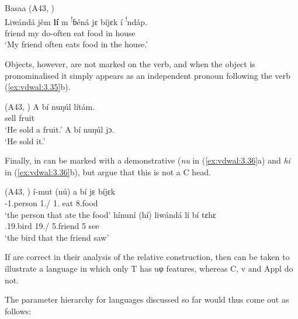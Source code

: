 \documentclass[output=paper]{langsci/langscibook}
\begin{document}
\ea\label{ex:vdwal:3.34}Basaa (A43, \citealt[277]{Hyman2003}) \label{bkm:Ref347562219}\\
    \gll    Liwándá  jêm  \textbf{lí}  m  \textsuperscript{!}ɓéná  jɛ  bíjɛk  í  \textsuperscript{!}ndáp.\\
        friend  my  \Sm{}  \Prs{}  do-often  eat  food  in  house\\
    \glt    ‘My friend often eats food in the house.’
\z

Objects, however, are not marked on the verb, and when the object is
pronominalised it simply appears as an independent pronoun following the verb
(\ref{ex:vdwal:3.35}b).

\ea\label{ex:vdwal:3.35}  (A43, \citealt[278]{Hyman2003})\label{bkm:Ref347562250}
    \ea
    \gll A  bí  nuŋúl  lítám.\\
        \Sm{}  \Ppp{}  sell  fruit  \\
    \glt    ‘He sold a fruit.’
    \ex A  bí  nuŋúl  jɔ.\\
        ‘He sold it.’
    \z
\z

Finally,  in  can be marked with a demonstrative
(\emph{nu} in (\ref{ex:vdwal:3.36}a) and \emph{hi} in (\ref{ex:vdwal:3.36}b), but
\citet{JenksEtAl2017} argue that this is not a C head.

\ea\label{ex:vdwal:3.36}  (A43, \citealt[19, 20]{JenksEtAl2017}) \label{bkm:Ref347562274}
    \ea
    \gll    í-mut  (nú)  a  bí  \ds{}jɛ  bíjɛk\\
            \Aug{}{}-1.person  1.\Rel/\Dem{}  1.\Sm{}  \Ppp{}  eat  8.food\\
    \glt        ‘the person that ate the food’
    \ex\label{bkm:Ref347929302}
    \gll    hínuní  (hí)  liwándá  lí  bí  \ds{}tɛhɛ\\
            \Aug{}.19.bird  19.\Rel/\Dem{}  5.friend  5\Sm{}  \Ppp{}  see\\
    \glt        ‘the bird that the friend saw’
    \z
\z

If \citet{JenksEtAl2017} are correct in their analysis of the relative
construction, then  can be taken to illustrate a language in which
only T has uφ features, whereas C, v and Appl do not.

The parameter hierarchy for  languages
discussed so far would thus come out as follows:\largerpage
\end{document}
